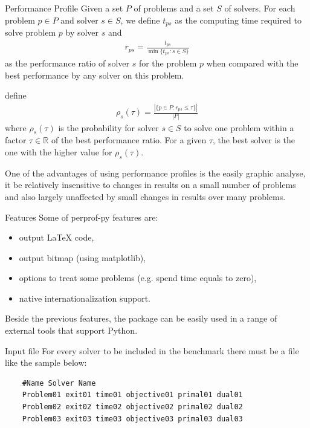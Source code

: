 \documentclass[a0paper,portrait]{baposter}
\begin{document}
\begin{poster}
\begin{posterbox}[column=0,below=auto]{Performance Profile}
    Given a set $P$ of problems and a set $S$ of solvers. For each problem $p
    \in P$ and solver $s \in S$, we define $t_{ps}$ as the computing time
    required to solve problem $p$ by solver $s$ and
    \begin{align*}
      r_{ps} = \frac{t_{ps}}{\min\{t_{ps}: s \in S\}}
    \end{align*}
    as the performance ratio of solver $s$ for the problem $p$ when compared
    with the best performance by any solver on this problem.

    \cite{Dolan2001} define
    \begin{align*}
      \rho_s(\tau) = \frac{| \{p \in P: r_{ps} \leq \tau\} |}{| P |}
    \end{align*}
    where $\rho_s(\tau)$ is the probability for solver $s \in S$ to solve one
    problem within a factor $\tau \in \mathbb{R}$ of the best performance
    ratio. For a given $\tau$, the best solver is the one with the higher
    value for $\rho_s(\tau)$.

    One of the advantages of using performance profiles is the easily graphic
    analyse, it be relatively insensitive to changes in results on a small
    number of problems and also largely unaffected by small changes in
    results over many problems.
  \end{posterbox}

  \begin{posterbox}[column=0,below=auto]{Features}
    Some of perprof-py features are:
    \begin{itemize}
      \item output LaTeX code,
      \item output bitmap (using matplotlib),
      \item options to treat some problems (e.g. spend time equals to zero),
      \item native internationalization support.
    \end{itemize}

    Beside the previous features, the package can be easily used in a range
    of external tools that support Python.
  \end{posterbox}

  \begin{posterbox}[column=1]{Input file}
    For every solver to be included in the benchmark there must be a file like
    the sample below:

    \begin{lstlisting}
    #Name Solver Name
    Problem01 exit01 time01 objective01 primal01 dual01
    Problem02 exit02 time02 objective02 primal02 dual02
    Problem03 exit03 time03 objective03 primal03 dual03
    \end{lstlisting}


\end{posterbox}
\end{poster}
\end{document}
